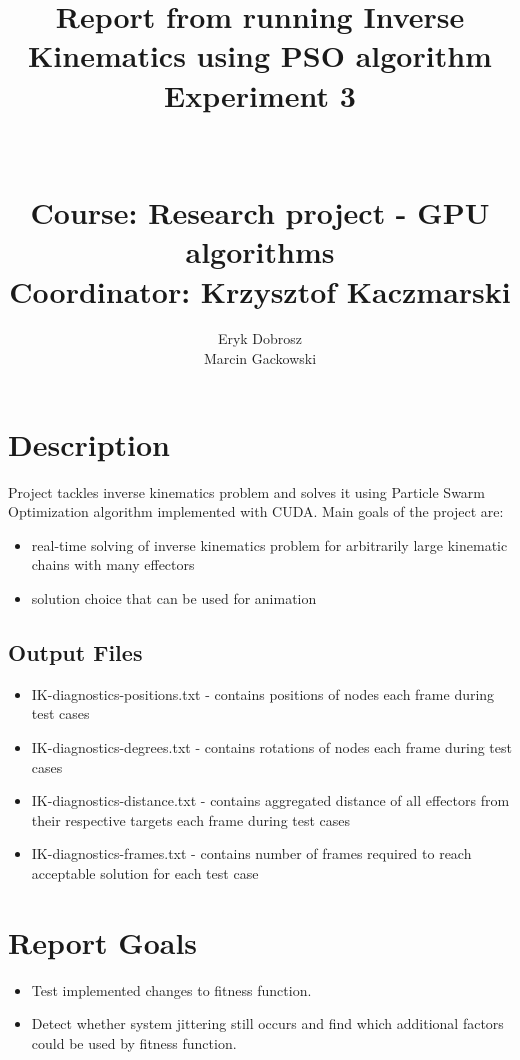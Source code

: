 \documentclass[]{report}
\begin{document}
\title{Report from running Inverse Kinematics using PSO algorithm \\
\large Experiment 3 \\~\\~\\
\large Course: Research project - GPU algorithms \\
\large Coordinator: Krzysztof Kaczmarski }
\author{Eryk Dobrosz \\
	Marcin Gackowski}

{\let\newpage\relax\maketitle}

\chapter*{Description}
Project tackles inverse kinematics problem and solves it using Particle Swarm Optimization algorithm implemented with CUDA. Main goals of the project are:

\begin{itemize}
	\item real-time solving of inverse kinematics problem for arbitrarily large kinematic chains with many effectors
	\item solution choice that can be used for animation
\end{itemize}

\section*{Output Files}
\begin{itemize}
\item IK-diagnostics-positions.txt - contains positions of nodes each frame during test cases
\item IK-diagnostics-degrees.txt - contains rotations of nodes each frame during test cases
\item IK-diagnostics-distance.txt - contains aggregated distance of all effectors from their respective targets each frame during test cases
\item IK-diagnostics-frames.txt - contains number of frames required to reach acceptable solution for each test case
\end{itemize}

\chapter*{Report Goals}
\begin{itemize}
	\item Test implemented changes to fitness function.
	\item Detect whether system jittering still occurs and find which additional factors could be used by fitness function.
\end{itemize}
\end{document}
